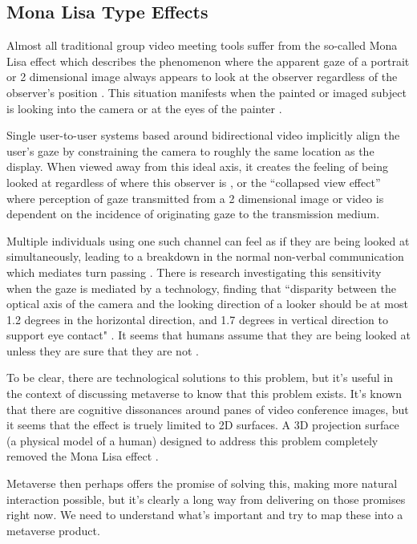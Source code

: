 \subsection{Mona Lisa Type Effects}
Almost all traditional group video meeting tools suffer from the so-called Mona Lisa effect which describes the phenomenon where the apparent gaze of a portrait or 2 dimensional image always appears to look at the observer regardless of the observer's position \cite{Vishwanath2005, Anstis1969, Wollaston1824}. This situation manifests when the painted or imaged subject is looking into the camera or at the eyes of the painter \cite{Loomis2008, Fullwood2006}.\par
Single user-to-user systems based around bidirectional video implicitly align the user's gaze by constraining the camera to roughly the same location as the display. When viewed away from this ideal axis, it creates the feeling of being looked at regardless of where this observer is \cite{Moubayed2012, Vishwanath2005, Anstis1969, Wollaston1824}, or the ``collapsed view effect'' \cite{Nguyen2005} where perception of gaze transmitted from a 2 dimensional image or video is dependent on the incidence of originating gaze to the transmission medium. \par
Multiple individuals using one such channel can feel as if they are being looked at simultaneously, leading to a breakdown in the normal non-verbal communication which mediates turn passing \cite{Vertegaal2002}.    
There is research investigating this sensitivity when the gaze is mediated by a technology, finding that ``disparity between the optical axis of the camera and the looking direction of a looker should be at most 1.2 degrees in the horizontal direction, and 1.7 degrees in vertical direction to support eye contact" \cite{Van_Eijk2010, Bock2008}. It seems that humans assume that they are being looked at unless they are sure that they are not \cite{Chen2002}.\par
To be clear, there are technological solutions to this problem, but it's useful in the context of discussing metaverse to know that this problem exists. It's known that there are cognitive dissonances around panes of video conference images, but it seems that the effect is truely limited to 2D surfaces. A 3D projection surface (a physical model of a human) designed to address this problem completely removed the Mona Lisa effect \cite{Moubayed2012}.\par 
Metaverse then perhaps offers the promise of solving this, making more natural interaction possible, but it's clearly a long way from delivering on those promises right now. We need to understand what's important and try to map these into a metaverse product.
